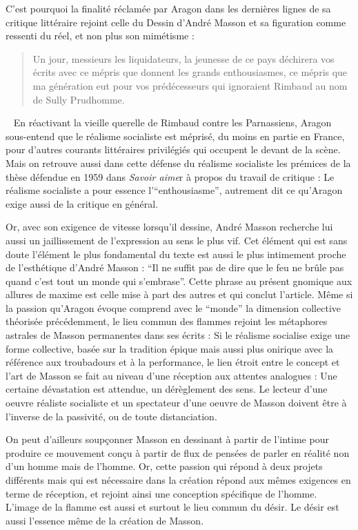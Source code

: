 	C’est pourquoi la finalité réclamée par Aragon dans les dernières lignes de sa critique littéraire rejoint celle du Dessin d’André Masson et sa figuration comme ressenti du réel, et non plus son mimétisme : 

\begin{quote}
Un jour, messieurs les liquidateurs, la jeunesse de ce pays déchirera vos écrits avec ce mépris que donnent les grands enthousiasmes, ce mépris que ma génération eut pour vos prédécesseurs qui ignoraient Rimbaud au nom de Sully Prudhomme. 	
\end{quote}
 
	 En réactivant la vieille querelle de Rimbaud contre les Parnassiens, Aragon sous-entend que le réalisme socialiste est méprisé, du moins en partie en France, pour d’autres courants littéraires privilégiés qui occupent le devant de la scène. Mais on retrouve aussi dans cette défense du réalisme socialiste les prémices de la thèse défendue en 1959 dans \emph{Savoir aime}r à propos du travail de critique : Le réalisme socialiste a pour essence l’\enquote{enthousiasme}, autrement dit ce qu’Aragon exige aussi de la critique en général.  

	Or, avec son exigence de vitesse lorsqu’il dessine, André Masson recherche lui aussi un jaillissement de l’expression au sens le plus vif. Cet élément qui est sans doute l’élément le plus fondamental du texte est aussi le plus intimement proche de l’esthétique d’André Masson : \enquote{Il ne suffit pas de dire que le feu ne brûle pas quand c’est tout un monde qui s’embrase}. Cette phrase au présent gnomique aux allures de maxime est celle mise à part des autres et qui conclut l’article. Même si la passion qu’Aragon évoque comprend avec le \enquote{monde} la dimension collective théorisée précédemment, le lieu commun des flammes rejoint les métaphores astrales de Masson permanentes dans ses écrits : Si le réalisme socialise exige une forme collective, basée sur la tradition épique mais aussi plus onirique avec la référence aux troubadours et à la performance, le lien étroit entre le concept et l’art de Masson se fait au niveau d’une réception aux attentes analogues : Une certaine dévastation est attendue, un dérèglement des sens. Le lecteur d’une oeuvre réaliste socialiste et un spectateur d’une oeuvre de Masson doivent être à l’inverse de la passivité, ou de toute distanciation. 

	On peut d’ailleurs soupçonner Masson en dessinant à partir de l’intime pour produire ce mouvement conçu à partir de flux de pensées de parler en réalité non d’un homme mais de l’homme. Or, cette passion qui répond à deux projets différents mais qui est nécessaire dans la création répond aux mêmes exigences en terme de réception, et rejoint ainsi une conception spécifique de l’homme. L’image de la flamme est aussi et surtout le lieu commun du désir. Le désir est aussi l’essence même de la création de Masson. 

